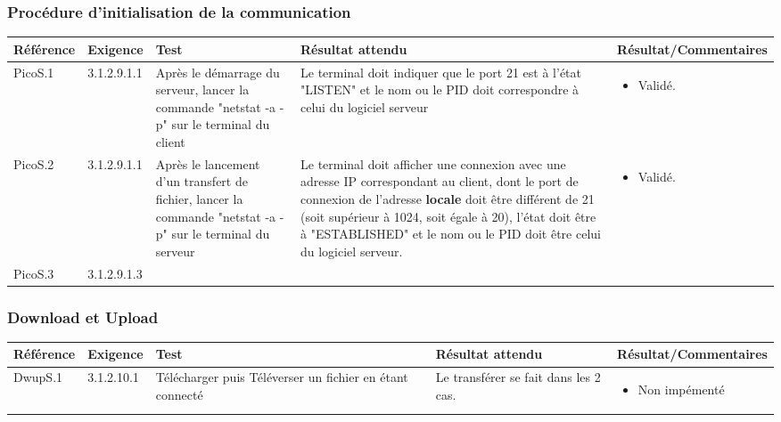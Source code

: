 \documentclass[10pt,a4paper,landscape]{report}
\begin{document}
\subsubsection{Procédure d’initialisation de la communication}
\begin{center}
	\bgroup
	\def\arraystretch{1.5}
	\begin{tabular}{|p{2.5cm}|p{2cm}|p{8cm}|p{8cm}|p{5cm}|}
		\hline
		\rowcolor{gris}Référence & Exigence & Test & Résultat attendu & Résultat/Commentaires\\
		\hline
		PicoS.1 & 3.1.2.9.1.1 & Après le démarrage du serveur, lancer la commande "netstat -a -p" sur le terminal du client & Le terminal doit indiquer que le port 21 est à l'état "LISTEN" et le nom ou le PID doit correspondre à celui du logiciel serveur &\vspace*{-0.2cm} \begin{itemize}[label=$\ast$] \item \textcolor{true}{Validé.}\end{itemize} \\
		\hline
		PicoS.2 & 3.1.2.9.1.1 & Après le lancement d'un transfert de fichier, lancer la commande "netstat -a -p" sur le terminal du serveur & Le terminal doit afficher une connexion avec une adresse IP correspondant au client, dont le port de connexion de l'adresse \textbf{locale} doit être différent de 21 (soit supérieur à 1024, soit égale à 20), l'état doit être à "ESTABLISHED" et le nom ou le PID doit être celui du logiciel serveur.&\vspace*{-0.2cm} \begin{itemize}[label=$\ast$] \item \textcolor{true}{Validé.}\end{itemize}\\
		\cline{1-2}
		PicoS.3 & 3.1.2.9.1.3 & & &\\
		\hline
	\end{tabular}
	\egroup
\end{center}

\subsubsection{Download et Upload}
\begin{center}
	\bgroup
	\def\arraystretch{1.5}
	\begin{tabular}{|p{2.5cm}|p{2cm}|p{8cm}|p{8cm}|p{5cm}|}
		\hline
		\rowcolor{gris}Référence & Exigence & Test & Résultat attendu & Résultat/Commentaires\\
		\hline
		DwupS.1 & 3.1.2.10.1 & Télécharger puis Téléverser un fichier en étant connecté & Le transférer se fait dans les 2 cas. &\vspace*{-0.2cm} \begin{itemize}[label=$\ast$] \item \textcolor{false}{Non impémenté}\end{itemize}
\\
		\hline
	\end{tabular}
	\egroup
\end{center}
\end{document}
